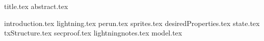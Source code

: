 \documentclass[11pt]{llncs}
\begin{document}
{title.tex}
\thispagestyle{plain}
{abstract.tex}

{introduction.tex}
{lightning.tex}
{perun.tex}
{sprites.tex}
{desiredProperties.tex}
{state.tex}
{txStructure.tex}
{secproof.tex}
{lightningnotes.tex}
{model.tex}

\end{document}
